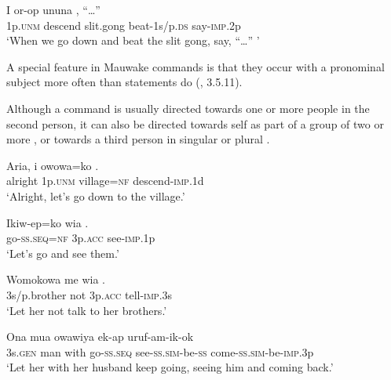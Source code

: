 \ea%
\label{ex:x1083}
\gll I  or-op  ununa    ,  ``{\dots''} \\
1p.\textsc{unm}  descend  slit.gong  beat-1s/p.\textsc{ds}  say-\textsc{imp}.2p      \\
\glt `When we go down and beat the slit gong, say, ``{\dots}'' '
\z



A special feature in Mauwake commands is that they occur with a pronominal  subject more often than statements do (, 3.5.11). 

Although a command is usually directed towards one or more people in the second person, it can also be directed towards self as part of a group of two  or more , or towards a third person in singular  or plural . 

\ea%
\label{ex:x1157}
\gll Aria,  i  owowa=ko  . \\
 alright  1p.\textsc{unm}  village=\textsc{nf}  descend-\textsc{imp}.1d     \\
\glt `Alright, let's go down to the village.'
\z





\ea%
\label{ex:x1158}
\gll Ikiw-ep=ko  wia  . \\
  go-\textsc{ss}.\textsc{seq}=\textsc{nf}  3p.\textsc{acc}  see-\textsc{imp}.1p    \\
\glt `Let's go and see them.'
\z





\ea%
\label{ex:x1159}
\gll Womokowa  me  wia  . \\
 3s/p.brother  not  3p.\textsc{acc}  tell-\textsc{imp}.3s     \\
\glt `Let her not talk to her brothers.'
\z





\ea%
\label{ex:x1160}
\gll Ona  mua  owawiya  ek-ap  uruf-am-ik-ok  \\
3s.\textsc{gen}  man  with  go-\textsc{ss}.\textsc{seq}  see-\textsc{ss}.\textsc{sim}-be-\textsc{ss}  come-\textsc{ss}.\textsc{sim}-be-\textsc{imp}.3p    \\
\glt `Let her with her husband keep going, seeing him and coming back.'
\z









